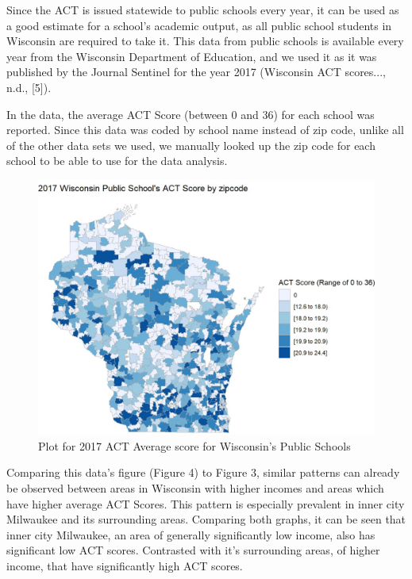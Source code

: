 \documentclass[letterpaper, 10 pt, conference]{ieeeconf}  %
\begin{document}
Since the ACT is issued statewide to public schools every year, it can be used as a good estimate for a school's academic output, as all public school students in Wisconsin are required to take it.
This data from public schools is available every year from the Wisconsin Department of Education, and we used it as it was published by the Journal Sentinel for the year 2017 (Wisconsin ACT scores..., n.d., [5]).

In the data, the average ACT Score (between 0 and 36) for each school was reported.
Since this data was coded by school name instead of zip code, unlike all of the other data sets we used, we manually looked up the zip code for each school to be able to use for the data analysis. 

\begin{figure}[h]
\begin{center}
\includegraphics[width=1.0\linewidth]{2017_ACT_Score.jpg}
\end{center}
\caption{Plot for 2017 ACT Average score for Wisconsin's Public Schools}
\label{fig:long}
\label{fig:onecol}
\end{figure}

Comparing this data's figure (Figure 4) to Figure 3, similar patterns can already be observed between areas in Wisconsin with higher incomes and areas which have higher average ACT Scores.
This pattern is especially prevalent in inner city Milwaukee and its surrounding areas.
Comparing both graphs, it can be seen that inner city Milwaukee, an area of generally significantly low income, also has significant low ACT scores.
Contrasted with it's surrounding areas, of higher income, that have significantly high ACT scores. 
\end{document}
